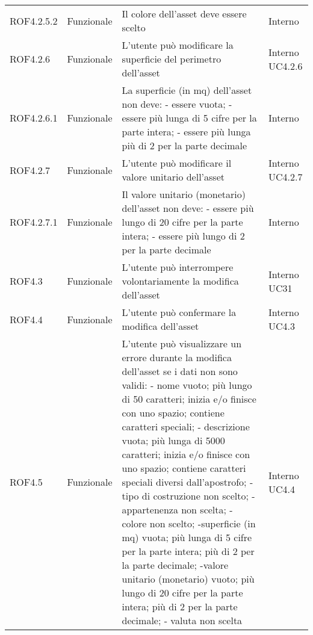 \begin{longtable}{p{2cm}!{\VRule[1pt]}p{2cm}!{\VRule[1pt]}p{5cm}!{\VRule[1pt]}p{1.5cm}}
	\\
	ROF4.2.5.2                       & Funzionale\newline               & Il colore dell'asset deve essere scelto                                                                                   & Interno                      \\
	ROF4.2.6                         & Funzionale\newline               & L'utente può modificare la superficie del perimetro dell'asset                                                           & Interno \newline UC4.2.6     
	\\
	ROF4.2.6.1&Funzionale\newline  & La superficie (in mq) dell'asset non deve:
	- essere vuota;
	- essere più lunga di 5 cifre per la parte intera;
	- essere più lunga  più di 2 per la parte decimale & Interno \\
	ROF4.2.7                         & Funzionale\newline               & L'utente può modificare il  valore unitario dell'asset                                                                   & Interno \newline UC4.2.7     
	\\
	ROF4.2.7.1&Funzionale\newline  & Il valore unitario (monetario) dell'asset non deve:
	- essere più lungo di 20 cifre per la parte intera;
	- essere più lungo di 2 per la parte decimale & Interno \\
	ROF4.3                           & Funzionale\newline               & L'utente può interrompere volontariamente la modifica dell'asset                                                         & Interno \newline UC31        
	\\
	ROF4.4                           & Funzionale\newline               & L'utente può confermare la modifica dell'asset                                                                           & Interno \newline UC4.3       
	\\
	ROF4.5&Funzionale\newline  & L'utente può visualizzare un errore durante la modifica dell'asset se i dati non sono validi:
	- nome vuoto; più lungo di 50 caratteri; inizia e/o finisce con uno spazio; contiene caratteri speciali;
	- descrizione vuota; più lunga di 5000 caratteri; inizia e/o finisce con uno spazio; contiene caratteri speciali diversi dall'apostrofo;
	- tipo di costruzione non scelto;
	- appartenenza non scelta;
	- colore non scelto;
	-superficie (in mq) vuota; più lunga di 5 cifre per la parte intera; più di 2 per la parte decimale;
	-valore unitario (monetario) vuoto; più lungo di 20 cifre per la parte intera; più di 2 per la parte decimale;
	- valuta non scelta & Interno \newline UC4.4
	\\


\end{longtable}
